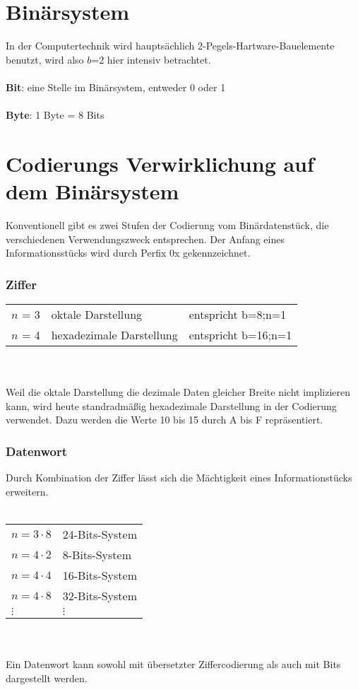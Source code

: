 \documentclass{article}
\begin{document}
    \section{Binärsystem}
    In der Computertechnik wird hauptsächlich 2-Pegels-Hartware-Bauelemente benutzt, wird also $b$=2 hier intensiv betrachtet.\\\\
    \textbf{Bit}: eine Stelle im Binärsystem, entweder 0 oder 1\\\\
    \textbf{Byte}: 1 Byte = 8 Bits
    \pagebreak

    \section{Codierungs Verwirklichung auf dem Binärsystem}
    Konventionell gibt es zwei Stufen der Codierung vom Binärdatenstück, die verschiedenen Verwendungszweck entsprechen.
    Der Anfang eines Informationsstücks wird durch Perfix 0x gekennzeichnet.
    \subsubsection*{Ziffer}
    \begin{tabular}{lll}
        $n$ = 3& oktale Darstellung& entspricht b=8;n=1\\
        $n$ = 4& hexadezimale Darstellung& entspricht b=16;n=1\\
    \end{tabular}\\\\
    Weil die oktale Darstellung die dezimale Daten gleicher Breite nicht implizieren kann, wird heute standradmäßig hexadezimale Darstellung in der Codierung verwendet. Dazu werden die Werte 10 bis 15 durch A bis F repräsentiert.\\
    \subsubsection*{Datenwort}
    Durch Kombination der Ziffer lässt sich die Mächtigkeit eines Informationstücks erweitern.\\\\
    \begin{tabular}{ll}
        $n=3\cdot8$&24-Bits-System\\
        $n=4\cdot2$&8-Bits-System\\
        $n=4\cdot4$&16-Bits-System\\
        $n=4\cdot8$&32-Bits-System\\
        $\vdots$&$\vdots$
    \end{tabular}\\\\
    Ein Datenwort kann sowohl mit übersetzter Ziffercodierung als auch mit Bits dargestellt werden.
\end{document}
